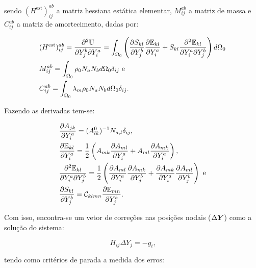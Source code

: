 \noindent sendo $(H^\text{est})_{ij}^{ab}$ a matriz hessiana estática elementar, $M_{ij}^{ab}$ a matriz de massa e $C_{ij}^{ab}$ a matriz de amortecimento, dadas por:

\begin{subequations}
    \begin{align}
         & (H^\text{est})_{ij}^{ab}=\frac{\partial^2{\mathbb{U}}}{\partial{Y_j^b}\partial{Y_i^a}}=\int_{\Omega_0}{\left({\frac{\partial{S_{kl}}}{\partial{Y_j^b}}\frac{\partial{\mathbb{E}_{kl}}}{\partial{Y_i^a}}+S_{kl}\frac{\partial^2{\mathbb{E}_{kl}}}{\partial{Y_i^a}\partial{Y_j^b}}}\right) d\Omega_0} \\
         & M_{ij}^{ab}=\int_{\Omega_0}{\rho_0N_aN_b d\Omega_0}\delta_{ij}\text{ e}                                                                                                                        \\
         & C_{ij}^{ab}=\int_{\Omega_0}{\lambda_m\rho_0N_aN_b d\Omega_0}\delta_{ij}\text{.}
    \end{align}
    \label{eq:CSD-HMC}
\end{subequations}

Fazendo as derivadas tem-se:

\begin{subequations}
    \begin{align}
         & \frac{\partial{A_{jk}}}{\partial{Y_i^a}}=(A^0_{lk})^{-1}N_{a,l}\delta_{ij}\text{,}\label{eq:CSD-derA}                                                                                           \\
         & \frac{\partial{\mathbb{E}_{kl}}}{\partial{Y_i^a}}=\frac{1}{2}\left({A_{mk}\frac{\partial{A_{ml}}}{\partial{Y_i^a}}+A_{ml}\frac{\partial{A_{mk}}}{\partial{Y_i^a}}}\right)\text{,}\label{eq:CSD-derE}                                     \\
         & \frac{\partial^2{\mathbb{E}_{kl}}}{\partial{Y_i^a}\partial{Y_j^b}}=\frac{1}{2}\left({\frac{\partial{A_{ml}}}{\partial{Y_i^a}}\frac{\partial{A_{mk}}}{\partial{Y_j^b}}+\frac{\partial{A_{mk}}}{\partial{Y_i^a}}\frac{\partial{A_{ml}}}{\partial{Y_j^b}}}\right)\text{ e}\label{eq:CSD-DderE} \\
         & \frac{\partial{S_{kl}}}{\partial{Y_j^b}}=\mathcal{C}_{klmn}\frac{\partial{\mathbb{E}_{mn}}}{\partial{Y_j^b}}\text{.}\label{eq:CSD-derS}                                                                        \\
    \end{align}
    \label{eq:CSD-derAES}
\end{subequations}

Com isso, encontra-se um vetor de correções nas posições nodais ($\Delta\boldsymbol{Y}$) como a solução do sistema:

\begin{equation}
    H_{ij}\Delta Y_j=-g_i\text{,}
\end{equation}

\noindent tendo como critérios de parada a medida dos erros:

